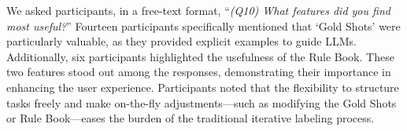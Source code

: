 We asked participants, in a free-text format, ``\textit{(Q10) What features did you find most useful?}'' Fourteen participants specifically mentioned that `Gold Shots' were particularly valuable, as they provided explicit examples to guide LLMs. 
Additionally, six participants highlighted the usefulness of the Rule Book. 
These two features stood out among the responses, demonstrating their importance in enhancing the user experience.
Participants noted that the flexibility to structure tasks freely and make on-the-fly adjustments---such as modifying the Gold Shots or Rule Book---eases the burden of the traditional iterative labeling process.








